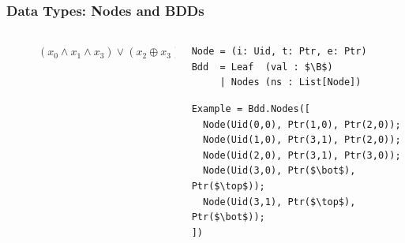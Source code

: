 \documentclass[english, aspectratio=169]{beamer}
\newcommand{\B}[0]{\ensuremath{\mathbb{B}}}
\begin{document}
\begin{frame}[t, fragile]
  \frametitle{Data Types: Nodes and BDDs}

  \begin{columns}
    \begin{column}[t]{0.4\linewidth}
      \begin{figure}
        \centering

        \begin{tikzpicture}[every node/.style={transform shape}]
          
        \end{tikzpicture}

        \caption{$(x_0 \wedge x_1 \wedge x_3) \vee (x_2 \oplus x_3)$}
      \end{figure}
    \end{column}
    \begin{column}[t]{0.6\linewidth}
      \begin{lstlisting}
Node = (i: Uid, t: Ptr, e: Ptr)
Bdd  = Leaf  (val : $\B$)
     | Nodes (ns : List[Node])
      \end{lstlisting}

      \begin{lstlisting}[firstnumber=4]
Example = Bdd.Nodes([
  Node(Uid(0,0), Ptr(1,0), Ptr(2,0));
  Node(Uid(1,0), Ptr(3,1), Ptr(2,0));
  Node(Uid(2,0), Ptr(3,1), Ptr(3,0));
  Node(Uid(3,0), Ptr($\bot$),    Ptr($\top$));
  Node(Uid(3,1), Ptr($\top$),    Ptr($\bot$));
])
      \end{lstlisting}
    \end{column}
  \end{columns}
\end{frame}
\end{document}
